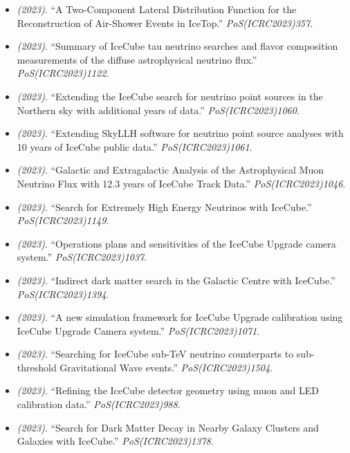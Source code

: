 \begin{itemize}
\item \textit{(2023)}. ``A Two-Component Lateral Distribution Function for the Reconstruction of Air-Shower Events in IceTop.'' \textit{PoS(ICRC2023)357}.  
\item \textit{(2023)}. ``Summary of IceCube tau neutrino searches and flavor composition measurements of the diffuse astrophysical neutrino flux.'' \textit{PoS(ICRC2023)1122}.  
\item \textit{(2023)}. ``Extending the IceCube search for neutrino point sources in the Northern sky with additional years of data.'' \textit{PoS(ICRC2023)1060}.  
\item \textit{(2023)}. ``Extending SkyLLH software for neutrino point source analyses with 10 years of IceCube public data.'' \textit{PoS(ICRC2023)1061}.  
\item \textit{(2023)}. ``Galactic and Extragalactic Analysis of the Astrophysical Muon Neutrino Flux with 12.3 years of IceCube Track Data.'' \textit{PoS(ICRC2023)1046}.  
\item \textit{(2023)}. ``Search for Extremely High Energy Neutrinos with IceCube.'' \textit{PoS(ICRC2023)1149}.  
\item \textit{(2023)}. ``Operations plans and sensitivities of the IceCube Upgrade camera system.'' \textit{PoS(ICRC2023)1037}.  
\item \textit{(2023)}. ``Indirect dark matter search in the Galactic Centre with IceCube.'' \textit{PoS(ICRC2023)1394}.  
\item \textit{(2023)}. ``A new simulation framework for IceCube Upgrade calibration using IceCube Upgrade Camera system.'' \textit{PoS(ICRC2023)1071}.  
\item \textit{(2023)}. ``Searching for IceCube sub-TeV neutrino counterparts to sub-threshold Gravitational Wave events.'' \textit{PoS(ICRC2023)1504}.  
\item \textit{(2023)}. ``Refining the IceCube detector geometry using muon and LED calibration data.'' \textit{PoS(ICRC2023)988}.  
\item \textit{(2023)}. ``Search for Dark Matter Decay in Nearby Galaxy Clusters and Galaxies with IceCube.'' \textit{PoS(ICRC2023)1378}.  

\end{itemize}
